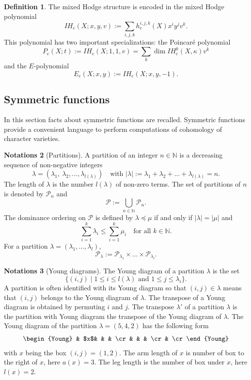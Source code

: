 \documentclass[JEP,XML,SOM,NoEqCountersInSection,Unicode,published]{cedram}
\newcommand{\rc}{\mathrm{c}}
\theoremstyle{definition}
\newtheorem{definition}{Definition}[section]
\newtheorem{notations}[definition]{Notations}
\theoremstyle{plain}
\newcommand{\IH}{\mathit{IH}}
\newcommand{\NN}{\mathbb N}
\newcommand{\Part}{\mathcal{P}}
\begin{document}
\begin{definition}\label{def_polynomial_coho}
The mixed Hodge structure is encoded in the mixed Hodge polynomial
\begin{equation}
\IH_{\rc}(X;x,y,v):=\sum_{i,j,k} h_\rc^{i,j,k}(X) x^i y^j v^k.
\end{equation}
This polynomial has two important specializations: the Poincaré polynomial
\begin{equation}
P_{\rc}(X;t):=\IH_{\rc}(X;1,1,v)=\sum_k \dim \IH_{\rc}^k(X,\kappa) v^k
\end{equation}
and the $E$-polynomial
\begin{equation}
E_\rc (X;x,y):=\IH_{\rc} (X;x,y,-1).
\end{equation}
\end{definition}

\subsection{Symmetric functions}
In this section facts about symmetric functions are recalled. Symmetric functions provide a convenient language to perform computations of cohomology of character varieties.
\begin{notations}[Partitions]\label{notations_partitions}
A partition of an integer $n\in\NN$ is a decreasing sequence of non-negative integers
\[
\lambda=(\lambda_1,\ \lambda_2,\dots, \lambda_{l(\lambda)}) \quad\text{with } |\lambda|:=\lambda_1+\lambda_2+\dots+\lambda_{l(\lambda)}=n.
\]
The length of $\lambda$ is the number $l(\lambda)$ of non-zero terms. The set of partitions of $n$ is denoted by $\Part_n$ and
\[
\Part:=\bigcup_{n\in\NN } \Part_n.
\]
The dominance ordering on $\Part$ is defined by $\lambda \preceq \mu$ if and only if
$|\lambda|=|\mu|$ and
\[
\sum_{i=1}^{k}\lambda_i \le \sum_{i=1}^{k}\mu_i \quad\text{for all } k\in \NN.
\]
For a partition $\lambda=(\lambda_1,\dots,\lambda_l)$,
\[
\Part_{\lambda} := \Part_{\lambda_1}\times\dots\times \Part_{\lambda_l}.
\]
\end{notations}
\begin{notations}[Young diagrams]\label{notations_young}
The Young diagram of a partition $\lambda$ is the set
\[
\lbrace (i,j) \mid 1\le i \le l(\lambda) \text{ and } 1 \le j \le \lambda_i\rbrace.
\]
A partition is often identified with its Young diagram so that $(i,j)\in \lambda$ means that $(i,j)$ belongs to the Young diagram of $\lambda$. The transpose of a Young diagram is obtained by permuting $i$ and $j$. The transpose $\lambda'$ of a partition $\lambda$ is the partition with Young diagram the transpose of the Young diagram of $\lambda$. The Young diagram of the partition $\lambda=(5,4,2)$ has the following form
\[
\begin{Young}
& $x$& & & \cr
& & & \cr
& \cr
\end{Young}
\]
with $x$ being the box $(i,j)=(1,2)$. The arm length of $x$ is number of box to the right of $x$, here $a(x)=3$. The leg length is the number of box under $x$, here $l(x)=2$.
\end{notations}
\end{document}
